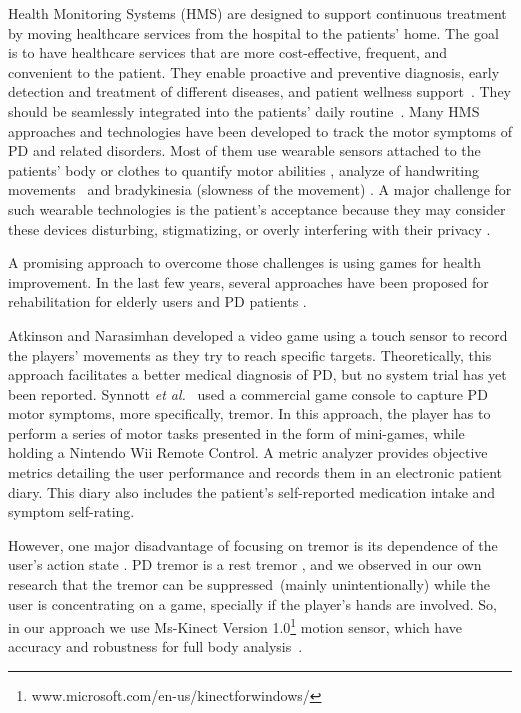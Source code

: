 \documentclass[10pt, conference, compsocconf]{IEEEtran}
\begin{document}
Health Monitoring Systems (HMS) are designed to support continuous treatment by moving healthcare services from the hospital to the patients' home. The goal is to have healthcare services that are more cost-effective, frequent, and convenient to the patient. They enable proactive and preventive diagnosis, early detection and treatment of different diseases, and patient wellness support~\cite{cbmshms2015}. They should be seamlessly integrated into the patients' daily routine~\cite{alemdar2015}. Many HMS approaches and technologies have been developed to track the motor symptoms of PD and related disorders. Most of them use wearable sensors attached to the patients' body or clothes to quantify motor abilities \cite{cbmsparkglove2015}, analyze of handwriting movements~\cite{cbmshandwriting2015} and bradykinesia (slowness of the movement) \cite{ambulatory2010}. A major challenge for such wearable technologies is the patient's acceptance because they may consider these devices disturbing, stigmatizing, or overly interfering with their privacy \cite{alemdar2015}.

A promising approach to overcome those challenges is using games for health improvement. In the last few years, several approaches have been proposed for rehabilitation for elderly users \cite{brox11} and PD patients \cite{atkinson2010,synnott_wiipd_2012}. 

Atkinson and Narasimhan \cite{atkinson2010} developed a video game using a touch sensor to record the players' movements as they try to reach specific targets. Theoretically, this approach facilitates a better medical diagnosis of PD, but no system trial has yet been reported. Synnott \textit{et al.}~\cite{synnott_wiipd_2012} used a commercial game console to capture PD motor symptoms, more specifically, tremor. In this approach, the player has to perform a series of motor tasks presented in the form of mini-games, while holding a Nintendo Wii Remote Control. A metric analyzer provides objective metrics detailing the user performance and records them in an electronic patient diary. This diary also includes the patient's self-reported medication intake and symptom self-rating. 

However, one major disadvantage of focusing on tremor is its dependence of the user's action state \cite{synnott_wiipd_2012}. PD tremor is a rest tremor \cite{national2006parkinson}, and we observed in our own research that the tremor can be suppressed~(mainly unintentionally) while the user is concentrating on a game, specially if the player's hands are involved. So, in our approach we use Ms-Kinect Version 1.0\footnote{www.microsoft.com/en-us/kinectforwindows/} motion sensor, which have accuracy and robustness for full body analysis~\cite{gabel2012}.
\end{document}
